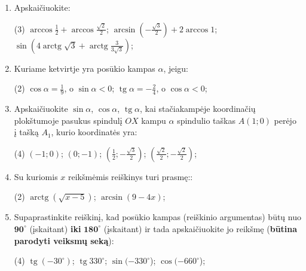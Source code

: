 \documentclass[a4paper]{article}
\DeclareMathOperator{\tg}{tg}
\DeclareMathOperator{\arctg}{arctg}
\begin{document}
\begin{enumerate}
      \item Apskaičiuokite:

            \begin{tasks}[item-format={\normalfont}, after-item-skip=4mm](3)
                  \task $\arccos{\frac{1}{2}} + \arccos{\frac{\sqrt{2}}{2}} $;
                  \task $\arcsin{(-\frac{\sqrt{3}}{2})} + 2\arccos{1} $;
                  \task $\sin({4\arctg{\sqrt{3}} +
                              \arctg{\frac{3}{3\sqrt{3}}}})  $;

            \end{tasks}

      \item Kuriame ketvirtje yra posūkio kampas $\alpha$, jeigu:
            \begin{tasks}[item-format={\normalfont}, after-item-skip=4mm](2)
                  \task $\cos \alpha = \frac{1}{9}$, o $\sin \alpha < 0$;
                  \task $\tg \alpha = -\frac{2}{4}$, o $\cos \alpha < 0$;
            \end{tasks}
      \item Apskaičiuokite $\sin \alpha$, $\cos \alpha$, $\tg \alpha$, kai
            stačiakampėje koordinačių plokštumoje pasukus spindulį $OX$ kampu
            $\alpha$ spindulio taškas $A(1; 0)$ perėjo į tašką $A_{1}$, kurio
            koordinatės
            yra:
            \begin{tasks}[item-format={\normalfont}, after-item-skip=4mm](4)
                  \task $(-1; 0)$;
                  \task $(0; -1)$;
                  \task $(\frac{1}{2}; -\frac{\sqrt{3}}{2})$;
                  \task $(\frac{\sqrt{2}}{2}; -\frac{\sqrt{2}}{2})$;
            \end{tasks}

      \item Su kuriomis $x$ reikšmėmis reiškinys turi prasmę::
            \begin{tasks}[item-format={\normalfont},
                        after-item-skip=4mm](2)
                  \task $\arctg(\sqrt{x-5})$;
                  \task $\arcsin(9-4x)$;
            \end{tasks}

            \item Supaprastinkite reiškinį, kad posūkio kampas (reiškinio argumentas) būtų nuo
            \textbf{$\boldsymbol{90^\circ}$} (įskaitant)
                  \textbf{iki}  $\boldsymbol{180^\circ}$ (įskaitant) ir tada apskaičiuokite jo
            reikšmę
            (\textbf{būtina parodyti veiksmų seką}):
            \begin{tasks}[item-format={\normalfont},
                        after-item-skip=4mm](4)
                  \task $\tg (-30^\circ)$;
                  \task $\tg 330^\circ$;
                  \task $\sin (-330^\circ$);
                  \task $\cos (-660^\circ$);
            \end{tasks}


\end{enumerate}
\end{document}
